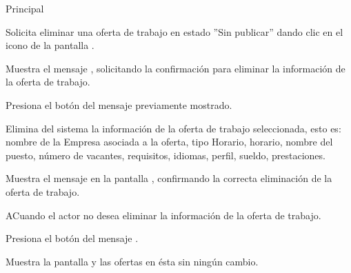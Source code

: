 	\begin{UCtrayectoria}{Principal}

		\UCpaso[\UCactor] Solicita eliminar una oferta de trabajo en estado ''Sin publicar'' dando clic en el icono  de la pantalla .

		\UCpaso Muestra el mensaje , solicitando la confirmación para eliminar la información de la oferta de trabajo.

		\UCpaso [\UCactor] Presiona el botón  del mensaje previamente mostrado.

		\UCpaso Elimina del sistema la información de la oferta de trabajo seleccionada, esto es: nombre de la Empresa asociada a la oferta, tipo Horario, horario, nombre del puesto, número de vacantes, requisitos, idiomas, perfil, sueldo, prestaciones.

		\UCpaso Muestra el mensaje  en la pantalla , confirmando la correcta eliminación de la oferta de trabajo.

	\end{UCtrayectoria}

	\begin{UCtrayectoriaA}{A}{Cuando el actor no desea eliminar la información de la oferta de trabajo.}

		\UCpaso [\UCactor] Presiona el botón  del mensaje .

		\UCpaso Muestra la pantalla  y las ofertas en ésta sin ningún cambio. 

	\end{UCtrayectoriaA}
	
